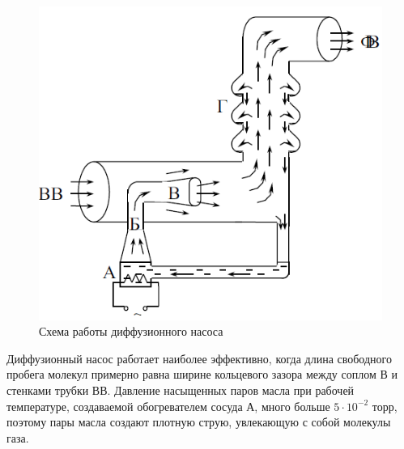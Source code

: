 \documentclass[a4paper, 12pt]{article}
\begin{document}
\begin{figure}[!h]
	\centering
	\includegraphics[width=0.4\linewidth]{5.png}
	\caption[]{Схема работы диффузионного насоса}
	\label{fig:Схема ВВ насоса}
\end{figure}

Диффузионный насос работает наиболее эффективно, когда длина свободного пробега молекул примерно равна ширине кольцевого зазора между соплом В и стенками трубки ВВ. Давление насыщенных паров масла при рабочей температуре, создаваемой обогревателем сосуда А, много больше $5\cdot 10^{-2}$ торр, поэтому пары масла создают плотную струю, увлекающую с собой молекулы газа.
\end{document}
